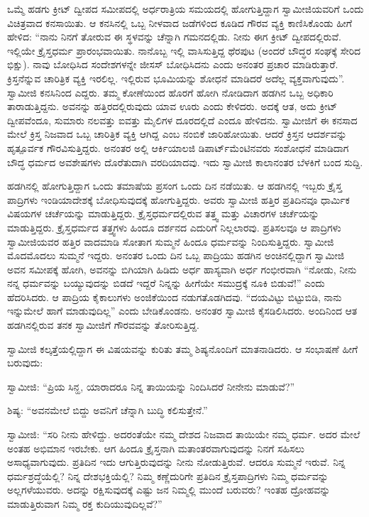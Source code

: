  ಒಮ್ಮೆ ಹಡಗು ಕ್ರೀಟ್ ದ್ವೀಪದ ಸಮೀಪದಲ್ಲಿ ಅರ್ಧರಾತ್ರಿಯ ಸಮಯದಲ್ಲಿ ಹೋಗುತ್ತಿದ್ದಾಗ ಸ್ವಾಮೀಜಿಯವರಿಗೆ ಒಂದು ವಿಚಿತ್ರವಾದ ಕನಸಾಯಿತು. ಆ ಕನಸಿನಲ್ಲಿ ಒಬ್ಬ ನೀಳವಾದ ಜಡೆಗಳಿಂದ ಕೂಡಿದ ಗೌರವ ವ್ಯಕ್ತಿ ಕಾಣಿಸಿಕೊಂಡು ಹೀಗೆ ಹೇಳಿದ: “ನಾನು ನಿನಗೆ ತೋರುವ ಈ ಸ್ಥಳವನ್ನು ಚೆನ್ನಾಗಿ ಗಮನದಲ್ಲಿಡು. ನೀನು ಈಗ ಕ್ರೀಟ್ ದ್ವೀಪದಲ್ಲಿರುವೆ. ಇಲ್ಲಿಯೇ ಕ್ರೈಸ್ತಧರ್ಮ ಪ್ರಾರಂಭವಾಯಿತು. ನಾನೊಬ್ಬ ಇಲ್ಲಿ ವಾಸಿಸುತ್ತಿದ್ದ ಥೆರಪುಟ (ಅಂದರೆ ಬೌದ್ಧರ ಸಂಘಕ್ಕೆ ಸೇರಿದ ಭಿಕ್ಷು). ನಾವು ಬೋಧಿಸಿದ ಸಂದೇಶಗಳನ್ನೇ ಜೀಸಸ್ ಬೋಧಿಸಿದನು ಎಂದು ಅನಂತರ ಪ್ರಚಾರ ಮಾಡಿರುತ್ತಾರೆ. ಕ್ರಿಸ್ತನೆನ್ನುವ ಚಾರಿತ್ರಿಕ ವ್ಯಕ್ತಿ ಇರಲಿಲ್ಲ. ಇಲ್ಲಿರುವ ಭೂಮಿಯನ್ನು ಶೋಧನೆ ಮಾಡಿದರೆ ಅದೆಲ್ಲ ವ್ಯಕ್ತವಾಗುವುದು”. ಸ್ವಾಮೀಜಿ ಕನಸಿನಿಂದ ಎದ್ದರು. ತಮ್ಮ ಕೋಣೆಯಿಂದ ಹೊರಗೆ ಹೋಗಿ ನೋಡಿದಾಗ ಹಡಗಿನ ಒಬ್ಬ ಅಧಿಕಾರಿ ತಾರಾಡುತ್ತಿದ್ದನು. ಅವನನ್ನು ಹತ್ತಿರದಲ್ಲಿರುವುದು ಯಾವ ಊರು ಎಂದು ಕೇಳಿದರು. ಅದಕ್ಕೆ ಆತ, ಅದು ಕ್ರೀಟ್ ದ್ವೀಪವೆಂದೂ, ಸುಮಾರು ನಲವತ್ತು ಐವತ್ತು ಮೈಲಿಗಳ ದೂರದಲ್ಲಿದೆ ಎಂದೂ ಹೇಳಿದನು. ಸ್ವಾಮೀಜಿಗೆ ಈ ಕನಸಾದ ಮೇಲೆ ಕ್ರಿಸ್ತ ನಿಜವಾದ ಒಬ್ಬ ಚಾರಿತ್ರಿಕ ವ್ಯಕ್ತಿ ಆಗಿದ್ದ ಎಂಬ ನಂಬಿಕೆ ಜಾರಿಹೋಯಿತು. ಆದರೆ ಕ್ರಿಸ್ತನ ಆದರ್ಶವನ್ನು ಹೃತ್ಪೂರ್ವಕ ಗೌರವಿಸುತ್ತಿದ್ದರು. ಅನಂತರ ಅಲ್ಲಿ ಆರ್ಕಿಯಾಲಜಿ ಡಿಪಾರ್ಟ್‍ಮೆಂಟಿನವರು ಸಂಶೋಧನೆ ಮಾಡಿದಾಗ ಬೌದ್ಧ ಧರ್ಮದ ಅವಶೇಷಗಳು ದೊರೆತುದಾಗಿ ವರದಿಯಾದವು. ಇದು ಸ್ವಾಮೀಜಿ ಕಾಲಾನಂತರ ಬೆಳಕಿಗೆ ಬಂದ ಸುದ್ದಿ. 

 ಹಡಗಿನಲ್ಲಿ ಹೋಗುತ್ತಿದ್ದಾಗ ಒಂದು ತಮಾಷೆಯ ಪ್ರಸಂಗ ಒಂದು ದಿನ ನಡೆಯಿತು. ಆ ಹಡಗಿನಲ್ಲಿ ಇಬ್ಬರು ಕ್ರೈಸ್ತ ಪಾದ್ರಿಗಳು ಇಂಡಿಯಾದೇಶಕ್ಕೆ ಬೋಧಿಸುವುದಕ್ಕೆ ಹೋಗುತ್ತಿದ್ದರು. ಅವರು ಸ್ವಾಮೀಜಿ ಹತ್ತಿರ ಪ್ರತಿದಿನವೂ ಧಾರ್ಮಿಕ ವಿಷಯಗಳ ಚರ್ಚೆಯನ್ನು ಮಾಡುತ್ತಿದ್ದರು. ಕ್ರೈಸ್ತಧರ್ಮದಲ್ಲಿರುವ ತತ್ತ್ವ ಮತ್ತು ವಿಚಾರಗಳ ಚರ್ಚೆಯನ್ನು ಮಾಡುತ್ತಿದ್ದರು. ಕ್ರೈಸ್ತಧರ್ಮದ ತತ್ತ್ವಗಳು ಹಿಂದೂ ದರ್ಶನದ ಎದುರಿಗೆ ನಿಲ್ಲಲಾರವು. ಪ್ರತಿಸಲವೂ ಆ ಪಾದ್ರಿಗಳು ಸ್ವಾಮೀಜಿಯವರ ಹತ್ತಿರ ವಾದಮಾಡಿ ಸೋತಾಗ ಸುಮ್ಮನೆ ಹಿಂದೂ ಧರ್ಮವನ್ನು ನಿಂದಿಸುತ್ತಿದ್ದರು. ಸ್ವಾಮೀಜಿ ಮೊದಮೊದಲು ಸುಮ್ಮನೆ ಇದ್ದರು. ಅನಂತರ ಒಂದು ದಿನ ಒಬ್ಬ ಪಾದ್ರಿಯು ಹಡಗಿನ ಅಂಚಿನಲ್ಲಿದ್ದಾಗ ಸ್ವಾಮೀಜಿ ಅವನ ಸಮೀಪಕ್ಕೆ ಹೋಗಿ, ಅವನನ್ನು ಬಿಗಿಯಾಗಿ ಹಿಡಿದು ಅರ್ಧ ಹಾಸ್ಯವಾಗಿ ಅರ್ಧ ಗಂಭೀರವಾಗಿ “ನೋಡು, ನೀನು ನನ್ನ ಧರ್ಮವನ್ನು ಬಯ್ಯುವುದನ್ನು ಬಿಡದೆ ಇದ್ದರೆ ನಿನ್ನನ್ನು ಹೀಗೆಯೇ ಸಮುದ್ರಕ್ಕೆ ನೂಕಿ ಬಿಡುವೆ!” ಎಂದು ಹೆದರಿಸಿದರು. ಆ ಪಾದ್ರಿಯ ಕೈಕಾಲುಗಳು ಅಂಜಿಕೆಯಿಂದ ನಡುಗತೊಡಗಿದವು. “ದಯವಿಟ್ಟು ಬಿಟ್ಟುಬಿಡಿ, ನಾನು ಇನ್ನುಮೇಲೆ ಹಾಗೆ ಮಾಡುವುದಿಲ್ಲ” ಎಂದು ಬೇಡಿಕೊಂಡನು. ಅನಂತರ ಸ್ವಾಮೀಜಿ ಕೈಸಡಿಲಿಸಿದರು. ಅಂದಿನಿಂದ ಆತ ಹಡಗಿನಲ್ಲಿರುವ ತನಕ ಸ್ವಾಮೀಜಿಗೆ ಗೌರವವನ್ನು ತೋರಿಸುತ್ತಿದ್ದ. 

 ಸ್ವಾಮೀಜಿ ಕಲ್ಕತ್ತೆಯಲ್ಲಿದ್ದಾಗ ಈ ವಿಷಯವನ್ನು ಕುರಿತು ತಮ್ಮ ಶಿಷ್ಯನೊಂದಿಗೆ ಮಾತನಾಡಿದರು. ಆ ಸಂಭಾಷಣೆ ಹೀಗೆ ಬರುವುದು: 

 ಸ್ವಾಮೀಜಿ: “ಪ್ರಿಯ ಸಿನ್ಹ, ಯಾರಾದರೂ ನಿನ್ನ ತಾಯಿಯನ್ನು ನಿಂದಿಸಿದರೆ ನೀನೇನು ಮಾಡುವೆ?” 

 ಶಿಷ್ಯ: “ಅವನಮೇಲೆ ಬಿದ್ದು ಅವನಿಗೆ ಚೆನ್ನಾಗಿ ಬುದ್ಧಿ ಕಲಿಸುತ್ತೇನೆ.” 

 ಸ್ವಾಮೀಜಿ: “ಸರಿ ನೀನು ಹೇಳಿದ್ದು. ಅದರಂತೆಯೇ ನಮ್ಮ ದೇಶದ ನಿಜವಾದ ತಾಯಿಯೇ ನಮ್ಮ ಧರ್ಮ. ಅದರ ಮೇಲೆ ಅಂತಹ ಅಭಿಮಾನ ಇರಬೇಕು. ಆಗ ಹಿಂದೂ ಕ್ರೈಸ್ತನಾಗಿ ಮತಾಂತರವಾಗುವುದನ್ನು ನಿನಗೆ ಸಹಿಸಲು ಅಸಾಧ್ಯವಾಗುವುದು. ಪ್ರತಿದಿನ ಇದು ಆಗುತ್ತಿರುವುದನ್ನು ನೀನು ನೋಡುತ್ತಿರುವೆ. ಆದರೂ ಸುಮ್ಮನೆ ಇರುವೆ. ನಿನ್ನ ಧರ್ಮಶ್ರದ್ಧೆಯೆಲ್ಲಿ? ನಿನ್ನ ದೇಶಭಕ್ತಿಯೆಲ್ಲಿ? ನಿಮ್ಮ ಕಣ್ಣೆದುರಿಗೇ ಪ್ರತಿದಿನ ಕ್ರೈಸ್ತಪಾದ್ರಿಗಳು ನಿಮ್ಮ ಧರ್ಮವನ್ನು ಅಲ್ಲಗಳೆಯುವರು. ಅದನ್ನು ರಕ್ಷಿಸುವುದಕ್ಕೆ ಎಷ್ಟು ಜನ ನಿಮ್ಮಲ್ಲಿ ಮುಂದೆ ಬರುವರು? ಇಂತಹ ದ್ರೋಹವನ್ನು ಮಾಡುತ್ತಿರುವಾಗ ನಿಮ್ಮ ರಕ್ತ ಕುದಿಯುವುದಿಲ್ಲವೆ?” 

